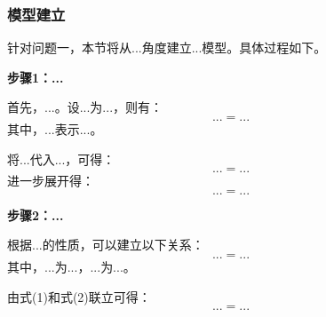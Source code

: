 
\subsubsection{模型建立}

针对问题一，本节将从...角度建立...模型。具体过程如下。

\textbf{步骤1：...}

首先，...。设...为...，则有：
\begin{equation}
    ... = ...
\end{equation}
其中，$...$表示...。

将...代入...，可得：
\begin{equation}
    ... = ...
\end{equation}
进一步展开得：
\begin{equation}
    ... = ...
\end{equation}

\textbf{步骤2：...}

根据...的性质，可以建立以下关系：
\begin{equation}
    ... = ...
\end{equation}
其中，$...$为...，$...$为...。

由式(1)和式(2)联立可得：
\begin{equation}
    ... = ...
\end{equation}

